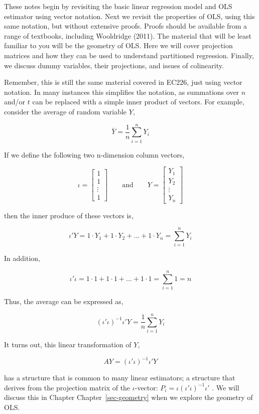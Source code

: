 \documentclass[
  letterpaper,
  DIV=11,
  numbers=noendperiod]{scrreprt}
\begin{document}
These notes begin by revisiting the basic linear regression model and
OLS estimator using vector notation. Next we revisit the properties of
OLS, using this same notation, but without extensive proofs. Proofs
should be available from a range of textbooks, including Wooldridge
(2011). The material that will be least familiar to you will be the
geometry of OLS. Here we will cover projection matrices and how they can
be used to understand partitioned regression. Finally, we discuss dummy
variables, their projections, and issues of colinearity.

Remember, this is still the same material covered in EC226, just using
vector notation. In many instances this simplifies the notation, as
summations over \(n\) and/or \(t\) can be replaced with a simple inner
product of vectors. For example, consider the average of random variable
\(Y\),

\[
\bar{Y} = \frac{1}{n}\sum_{i=1}^{n}Y_i
\]

If we define the following two n-dimension column vectors,

\[
\iota = \begin{bmatrix}1 \\ 1 \\ \vdots \\ 1\end{bmatrix}\qquad \text{and}\qquad Y = \begin{bmatrix}Y_1 \\ Y_2 \\ \vdots \\ Y_n\end{bmatrix}
\]

then the inner produce of these vectors is,

\[
\iota'Y = 1\cdot Y_1+1\cdot Y_2+\dots+1\cdot Y_n = \sum_{i=1}^{n}Y_i
\]

In addition,

\[
\iota'\iota = 1\cdot 1+1\cdot 1+\dots+1\cdot 1 = \sum_{i=1}^{n}1 = n
\]

Thus, the average can be expressed as,

\[
(\iota'\iota)^{-1}\iota'Y = \frac{1}{n}\sum_{i=1}^{n}Y_i
\]

It turns out, this linear transformation of \(Y\),

\[
AY = (\iota'\iota)^{-1}\iota'Y
\]

has a structure that is common to many linear estimators; a structure
that derives from the projection matrix of the \(\iota\)-vector:
\(P_{\iota} =\iota(\iota'\iota)^{-1}\iota'\) . We will discuss this in
Chapter Chapter~\ref{sec-geometry} when we explore the geometry of OLS.
\end{document}
